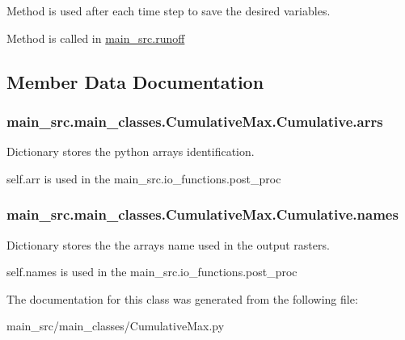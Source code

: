 Method is used after each time step to save the desired variables. 

Method is called in \hyperlink{namespacemain__src_1_1runoff}{main\-\_\-src.\-runoff} 

\subsection{Member Data Documentation}
\hypertarget{classmain__src_1_1main__classes_1_1CumulativeMax_1_1Cumulative_a9fd5e1bfcd14960a08e8473a21e26de1}{
\subsubsection[{arrs}]{\setlength{\rightskip}{0pt plus 5cm}main\-\_\-src.\-main\-\_\-classes.\-Cumulative\-Max.\-Cumulative.\-arrs}}\label{classmain__src_1_1main__classes_1_1CumulativeMax_1_1Cumulative_a9fd5e1bfcd14960a08e8473a21e26de1}


Dictionary stores the python arrays identification. 

self.\-arr is used in the main\-\_\-src.\-io\-\_\-functions.\-post\-\_\-proc \hypertarget{classmain__src_1_1main__classes_1_1CumulativeMax_1_1Cumulative_a87004d3354551a07263b9aa297c4beeb}{
\subsubsection[{names}]{\setlength{\rightskip}{0pt plus 5cm}main\-\_\-src.\-main\-\_\-classes.\-Cumulative\-Max.\-Cumulative.\-names}}\label{classmain__src_1_1main__classes_1_1CumulativeMax_1_1Cumulative_a87004d3354551a07263b9aa297c4beeb}


Dictionary stores the the arrays name used in the output rasters. 

self.\-names is used in the main\-\_\-src.\-io\-\_\-functions.\-post\-\_\-proc 

The documentation for this class was generated from the following file\-:\begin{DoxyCompactItemize}
\item 
main\-\_\-src/main\-\_\-classes/Cumulative\-Max.\-py\end{DoxyCompactItemize}

